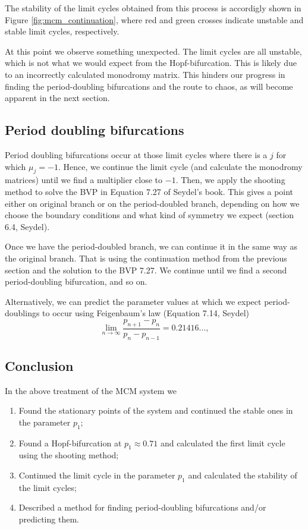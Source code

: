 The stability of the limit cycles obtained from this process is accordigly shown in Figure \ref{fig:mcm_continuation}, where 
red and green crosses indicate unstable and stable limit cycles, respectively. 

At this point we observe something unexpected. The limit cycles are all unstable, which is not what we would expect from the
Hopf-bifurcation. This is likely due to an incorrectly calculated monodromy matrix. 
This hinders our progress in finding the period-doubling bifurcations and the route to chaos, as will become apparent in the next section.

\subsection{Period doubling bifurcations}
Period doubling bifurcations occur at those limit cycles where there is a $j$ for which $\mu_j = -1$.
Hence, we continue the limit cycle (and calculate the monodromy matrices) until we find a multiplier close to $-1$. Then, we apply the
shooting method to solve the BVP in Equation 7.27 of Seydel's book. This gives a point
either on original branch or on the period-doubled branch, depending on how we choose the boundary conditions
and what kind of symmetry we expect (section 6.4, Seydel). 

Once we have the period-doubled branch, we can continue it in the same way as the original branch. That is using the continuation method
from the previous section and the solution to the BVP 7.27. We continue until
we find a second period-doubling bifurcation, and so on. 

Alternatively, we can predict the parameter values at which we expect period-doublings 
to occur using Feigenbaum's law (Equation 7.14, Seydel)
\[
    \lim_{n \to \infty} \frac{p_{n+1} - p_n}{p_{n} - p_{n-1}} = 0.21416 \dots,
\]

\subsection{Conclusion}
In the above treatment of the MCM system we 
\begin{enumerate}
    \item Found the stationary points of the system and continued the stable ones in the parameter $p_1$;
    \item Found a Hopf-bifurcation at $p_1 \approx 0.71$ and calculated the first limit cycle using the shooting method;
    \item Continued the limit cycle in the parameter $p_1$ and calculated the stability of the limit cycles;
    \item Described a method for finding period-doubling bifurcations and/or predicting them.
\end{enumerate}

